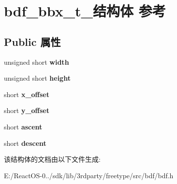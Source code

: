 \hypertarget{structbdf__bbx__t__}{}\section{bdf\+\_\+bbx\+\_\+t\+\_\+结构体 参考}
\label{structbdf__bbx__t__}
\subsection*{Public 属性}
\begin{DoxyCompactItemize}
\item 
\mbox{\label{structbdf__bbx__t___a42cb590403cf4abaca1398c64adac19e}} 
unsigned short {\bfseries width}
\item 
\mbox{\label{structbdf__bbx__t___abcf60c0bccd7ee6594de7c75ddcdaf66}} 
unsigned short {\bfseries height}
\item 
\mbox{\label{structbdf__bbx__t___a026adf2cc939912e1f7849bab3588bc4}} 
short {\bfseries x\+\_\+offset}
\item 
\mbox{\label{structbdf__bbx__t___a71a5b7f55dbeff54136c6913bb99ee1e}} 
short {\bfseries y\+\_\+offset}
\item 
\mbox{\label{structbdf__bbx__t___a9a2715ab117e23138ded56d01d1ef434}} 
short {\bfseries ascent}
\item 
\mbox{\label{structbdf__bbx__t___ad3b351b7ddb9cd4500edb451412468f8}} 
short {\bfseries descent}
\end{DoxyCompactItemize}


该结构体的文档由以下文件生成\+:\begin{DoxyCompactItemize}
\item 
E\+:/\+React\+O\+S-\/0../sdk/lib/3rdparty/freetype/src/bdf/bdf.\+h\end{DoxyCompactItemize}
